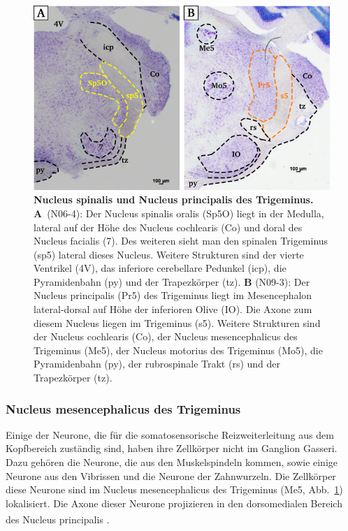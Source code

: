 \documentclass[12pt,a4paper,pdftex]{article}
\begin{document}
\begin{figure}[H]
    \centering
    \includegraphics[width = \textwidth]
    {pictures/somatosensory/somato_kopf.png}
    \caption[Nucleus spinalis und Nucleus principalis des Trigeminus]{\textbf{Nucleus spinalis und Nucleus principalis des Trigeminus.}\\
     \textbf{A}~(N06-4): Der Nucleus spinalis oralis (Sp5O) liegt in der Medulla, lateral auf der Höhe des Nucleus cochlearis (Co) und doral des Nucleus facialis (7). Des weiteren sieht man den spinalen Trigeminus (sp5) lateral dieses Nucleus. Weitere Strukturen sind der vierte Ventrikel (4V), das inferiore cerebellare Pedunkel (icp), die Pyramidenbahn (py) und der Trapezkörper (tz).
     \textbf{B} (N09-3): Der Nucleus principalis (Pr5) des Trigeminus liegt im Mesencephalon lateral-dorsal auf Höhe der inferioren Olive (IO). Die Axone zum diesem Nucleus liegen im Trigeminus (s5). Weitere Strukturen sind der Nucleus cochlearis (Co), der Nucleus mesencephalicus des Trigeminus (Me5), der Nucleus motorius des Trigeminus (Mo5),  die Pyramidenbahn (py), der rubrospinale Trakt (rs) und der Trapezkörper (tz).}
    \label{fig:somato_Pr5}
\end{figure}

\subsubsection*{Nucleus mesencephalicus des Trigeminus}
Einige der Neurone, die für die somatosensorische Reizweiterleitung aus dem Kopfbereich zuständig sind, haben ihre Zellkörper nicht im Ganglion Gasseri. Dazu gehören die Neurone, die aus den Muskelspindeln kommen, sowie einige Neurone aus den Vibrissen und die Neurone der Zahnwurzeln. Die Zellkörper diese Neurone sind im Nucleus mesencephalicus des Trigeminus (Me5, Abb.~\ref{fig:somato_Pr5}) lokalisiert. Die Axone dieser Neurone projizieren in den dorsomedialen Bereich des Nucleus principalis  \textsuperscript{\cite[5]{heldmaier2003tierphysiologie}}.
\end{document}
